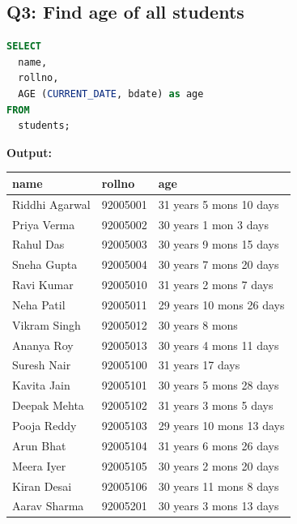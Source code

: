 \documentclass[11pt, a4paper]{article}
\begin{document}
\subsection*{Q3: Find age of all students}
\begin{lstlisting}[language=SQL]
SELECT
  name,
  rollno,
  AGE (CURRENT_DATE, bdate) as age
FROM
  students;
\end{lstlisting}
\vspace{0.3cm}
\textbf{Output:}\vspace{0.2cm}
\begin{center}
\begin{tabular}{|l|l|l|}
\hline
\textbf{name} & \textbf{rollno} & \textbf{age} \\ \hline
Riddhi Agarwal                 & 92005001 & 31 years 5 mons 10 days \\ \hline
Priya Verma                    & 92005002 & 30 years 1 mon 3 days \\ \hline
Rahul Das                      & 92005003 & 30 years 9 mons 15 days \\ \hline
Sneha Gupta                    & 92005004 & 30 years 7 mons 20 days \\ \hline
Ravi Kumar                     & 92005010 & 31 years 2 mons 7 days \\ \hline
Neha Patil                     & 92005011 & 29 years 10 mons 26 days \\ \hline
Vikram Singh                   & 92005012 & 30 years 8 mons \\ \hline
Ananya Roy                     & 92005013 & 30 years 4 mons 11 days \\ \hline
Suresh Nair                    & 92005100 & 31 years 17 days \\ \hline
Kavita Jain                    & 92005101 & 30 years 5 mons 28 days \\ \hline
Deepak Mehta                   & 92005102 & 31 years 3 mons 5 days \\ \hline
Pooja Reddy                    & 92005103 & 29 years 10 mons 13 days \\ \hline
Arun Bhat                      & 92005104 & 31 years 6 mons 26 days \\ \hline
Meera Iyer                     & 92005105 & 30 years 2 mons 20 days \\ \hline
Kiran Desai                    & 92005106 & 30 years 11 mons 8 days \\ \hline
Aarav Sharma                   & 92005201 & 30 years 3 mons 13 days \\ \hline

\end{tabular}
\end{center}
\end{document}
